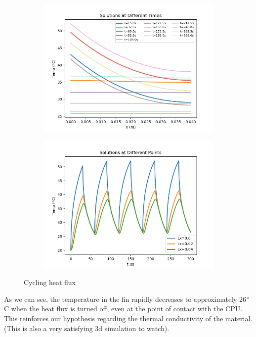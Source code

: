 \documentclass{article}
\begin{document}
\begin{figure}[H]
\begin{subfigure}{.5\textwidth}
  \centering
  \includegraphics[width=1.1\linewidth]{images/cycl1.png}
  \caption{}
  \label{fig:sfig1}
\end{subfigure}
\begin{subfigure}{.5\textwidth}
  \centering
  \includegraphics[width=1.1\linewidth]{images/cycl2.png}
  \caption{}
\end{subfigure}
\caption{Cycling heat flux}
\label{fig:fig}
\end{figure}

As we can see, the temperature in the fin rapidly decreases to approximately 26$\degree$C when the heat flux is turned off, even at the point of contact with the CPU. This reinforces our hypothesis regarding the thermal conductivity of the material. (This is also a very satisfying 3d simulation to watch). \\ 
\end{document}
